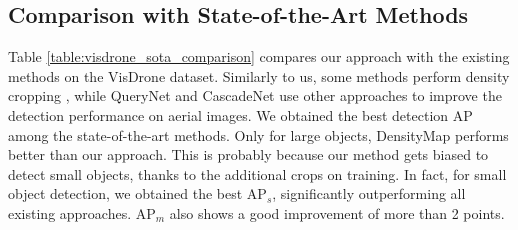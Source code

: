 \begin{table}
    \centering
    \caption{Results with anchor free detector FCOS on the Visdrone dataset. All results are without using P2.}
    \label{table:fcos_result}
\end{table}

\subsection{Comparison with State-of-the-Art Methods}
Table \ref{table:visdrone_sota_comparison} compares our approach with the existing methods on the VisDrone dataset. Similarly to us, some methods perform density cropping \cite{clusnet-Yang-2019,dmap-Li-2020,dmap-Duan-2021,glsan-Deng-2020}, while QueryNet\cite{querydet-Yang-2022} and CascadeNet \cite{cascadenet-Zhang-2019} use other approaches to improve the detection performance on aerial images. We obtained the best detection AP among the state-of-the-art methods. Only for large objects, DensityMap performs better than our approach. This is probably because our method gets biased to detect small objects, thanks to the additional crops on training. In fact, for small object detection, we obtained the best $\textrm{AP}_{s}$, significantly outperforming all existing approaches. $\textrm{AP}_{m}$ also shows a good improvement of more than 2 points.

